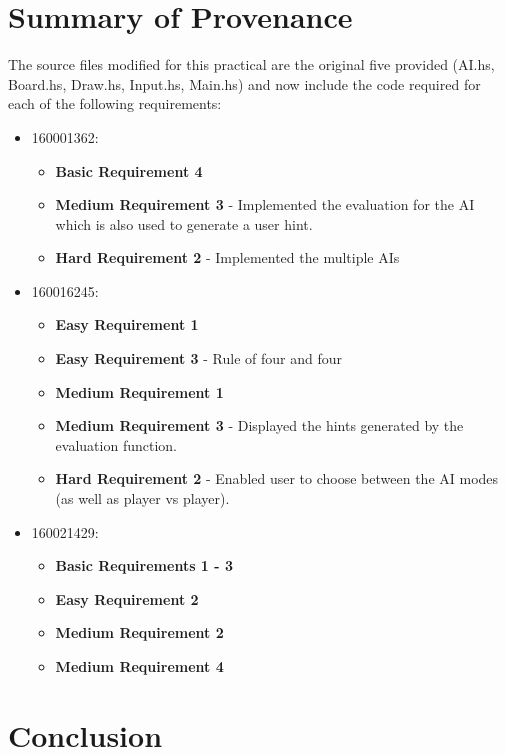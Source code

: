 \documentclass[11]{article}
\begin{document}
	\section{Summary of Provenance}
			The source files modified for this practical are the original five provided (AI.hs, Board.hs, Draw.hs, Input.hs, Main.hs) and now include the code required for each of the following requirements:
			\begin{itemize}
				\item 160001362:
					\begin{itemize}
						\item \textbf{Basic Requirement 4}
						\item \textbf{Medium Requirement 3} - Implemented the evaluation for the AI which is also used to generate a user hint.
						\item \textbf{Hard Requirement 2} - Implemented the multiple AIs
					\end{itemize}
					
				\item 160016245:
					\begin{itemize}
						\item \textbf{Easy Requirement 1}
						\item \textbf{Easy Requirement 3} - Rule of four and four
						\item \textbf{Medium Requirement 1}
						\item \textbf{Medium Requirement 3} - Displayed the hints generated by the evaluation function.
						\item \textbf{Hard Requirement 2} - Enabled user to choose between the AI modes (as well as player vs player).
					\end{itemize}
					
				\item 160021429:
					\begin{itemize}
						\item \textbf{Basic Requirements 1 - 3}
						\item \textbf{Easy Requirement 2}
						\item \textbf{Medium Requirement 2}
						\item \textbf{Medium Requirement 4}
					\end{itemize}
			\end{itemize}
				
	
\section{Conclusion}
\end{document}
